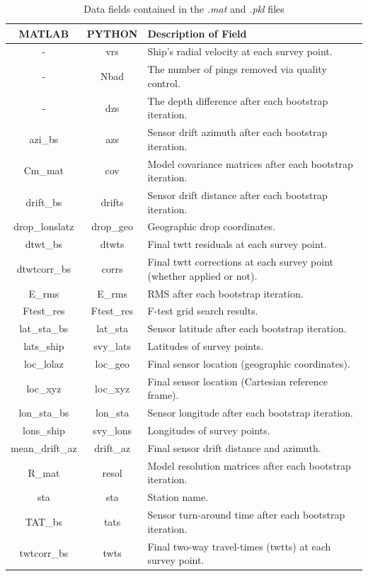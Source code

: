 \documentclass[titlepage]{article}
\begin{document}
  \begin{table}[h!]
   \centering
   \caption{Data fields contained in the \textit{.mat} and \textit{.pkl} files}
   \begin{tabularx}{\linewidth}{|c|c|X|}
    \hline
    \textbf{MATLAB} & \textbf{PYTHON} & \textbf{Description of Field} \\ \hline
    -               & vrs        & Ship’s radial velocity at each survey point. \\ \hline
    -               & Nbad       & The number of pings removed via quality control. \\ \hline
    -               & dzs        & The depth difference after each bootstrap iteration. \\ \hline
    azi\_bs         & azs        & Sensor drift azimuth after each bootstrap iteration. \\ \hline
    Cm\_mat         & cov        & Model covariance matrices after each bootstrap iteration. \\ \hline
    drift\_bs       & drifts     & Sensor drift distance after each bootstrap iteration. \\ \hline
    drop\_lonslatz  & drop\_geo  & Geographic drop coordinates. \\ \hline
    dtwt\_bs        & dtwts      & Final twtt residuals at each survey point. \\ \hline
    dtwtcorr\_bs    & corrs      & Final twtt corrections at each survey point (whether applied or not). \\ \hline
    E\_rms          & E\_rms     & RMS after each bootstrap iteration. \\ \hline
    Ftest\_res      & Ftest\_res & F-test grid search results. \\ \hline
    lat\_sta\_bs    & lat\_sta   & Sensor latitude after each bootstrap iteration. \\ \hline
    lats\_ship      & svy\_lats  & Latitudes of survey points. \\ \hline
    loc\_lolaz      & loc\_geo   & Final sensor location (geographic coordinates). \\ \hline
    loc\_xyz        & loc\_xyz   & Final sensor location (Cartesian reference frame). \\ \hline
    lon\_sta\_bs    & lon\_sta   & Sensor longitude after each bootstrap iteration. \\ \hline
    lons\_ship      & svy\_lons  & Longitudes of survey points. \\ \hline
    mean\_drift\_az & drift\_az  & Final sensor drift distance and azimuth. \\ \hline
    R\_mat          & resol      & Model resolution matrices after each bootstrap iteration. \\ \hline
    sta             & sta        & Station name. \\ \hline
    TAT\_bs         & tats       & Sensor turn-around time after each bootstrap iteration. \\ \hline
    twtcorr\_bs     & twts       & Final two-way travel-times (twtts) at each survey point. \\ \hline
    \end{tabularx}
   \end{table}
  
\end{document}
